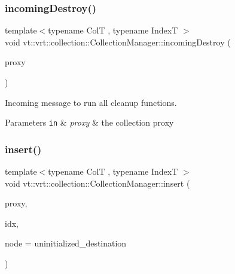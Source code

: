 \subsubsection{\texorpdfstring{incoming\+Destroy()}{incomingDestroy()}}
{\footnotesize\ttfamily template$<$typename ColT , typename IndexT $>$ \\
void vt\+::vrt\+::collection\+::\+Collection\+Manager\+::incoming\+Destroy (\begin{DoxyParamCaption}\item[{\hyperlink{structvt_1_1vrt_1_1collection_1_1_collection_manager_a56458ed7f9bb22b631b9b3a745f42f94}{Collection\+Proxy\+Wrap\+Type}$<$ ColT, IndexT $>$ const \&}]{proxy }\end{DoxyParamCaption})\hspace{0.3cm}{\ttfamily [private]}}



Incoming message to run all cleanup functions. 


\begin{DoxyParams}[1]{Parameters}
\mbox{\tt in}  & {\em proxy} & the collection proxy \\
\hline
\end{DoxyParams}
\mbox{\label{structvt_1_1vrt_1_1collection_1_1_collection_manager_af7c0033bd57a7dbb3e70888e7fb2e1a9}} 
\subsubsection{\texorpdfstring{insert()}{insert()}}
{\footnotesize\ttfamily template$<$typename ColT , typename IndexT $>$ \\
void vt\+::vrt\+::collection\+::\+Collection\+Manager\+::insert (\begin{DoxyParamCaption}\item[{\hyperlink{structvt_1_1vrt_1_1collection_1_1_collection_manager_a56458ed7f9bb22b631b9b3a745f42f94}{Collection\+Proxy\+Wrap\+Type}$<$ ColT, IndexT $>$ const \&}]{proxy,  }\item[{IndexT}]{idx,  }\item[{\hyperlink{namespacevt_a866da9d0efc19c0a1ce79e9e492f47e2}{Node\+Type} const \&}]{node = {\ttfamily uninitialized\+\_\+destination} }\end{DoxyParamCaption})}



